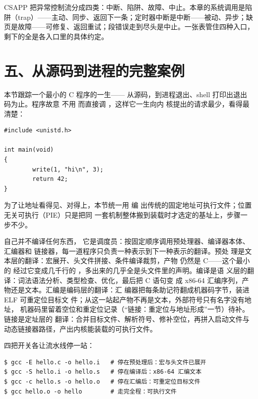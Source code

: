 \begin{classicnote}
CSAPP 把异常控制流分成四类：中断、陷阱、故障、中止。本章的系统调用是陷阱（trap）——主动、同步、返回下一条；定时器中断是中断——被动、异步；缺页是故障——可修复、返回重试；段错误走到尽头是中止。一张表管住四种入口，剩下的全是各入口里的具体约定。
\end{classicnote}

\section{五、从源码到进程的完整案例}

本节跟踪一个最小的 C 程序的一生——
从源码，到进程退出、shell 打印出退出码为止。程序故意
不用  而直接调 ，这样它一生向内
核提出的请求最少，看得最清楚：

\begin{lstlisting}
#include <unistd.h>

int main(void)
{
        write(1, "hi\n", 3);
        return 42;
}
\end{lstlisting}

为了让地址看得见、对得上，本节统一用  编
出传统的固定地址可执行文件；位置无关可执行（PIE）只是把同
一套机制整体搬到装载时才选定的基址上，步骤一步不少。

 自己并不编译任何东西，
它是调度员：按固定顺序调用预处理器、编译器本体、汇编器和
链接器，每一道程序只负责一种表示到下一种表示的翻译。预处
理是文本层的翻译：宏展开、头文件拼接、条件编译裁剪，产物
仍然是 C——这个最小的  经过它变成几千行的
，多出来的几乎全是头文件里的声明。编译是语
义层的翻译：词法语法分析、类型检查、优化，最后把 C 语句变
成 x86-64 汇编序列，产物还是文本。汇编是编码层的翻译：汇
编器把每条助记符翻成机器码字节，装进 ELF 可重定位目标文
件；从这一站起产物不再是文本，外部符号只有名字没有地址，
机器码里留着空位和重定位记录（“链接：重定位与地址形成”一节）待补。链接是定址层的
翻译：合并目标文件、解析符号、修补空位，再拼入启动文件与
动态链接器路径，产出内核能装载的可执行文件。

四把开关各让流水线停一站：

\begin{lstlisting}
$ gcc -E hello.c -o hello.i   # 停在预处理后：宏与头文件已展开
$ gcc -S hello.i -o hello.s   # 停在编译后：x86-64 汇编文本
$ gcc -c hello.s -o hello.o   # 停在汇编后：可重定位目标文件
$ gcc hello.o -o hello        # 走完全程：可执行文件
\end{lstlisting}

